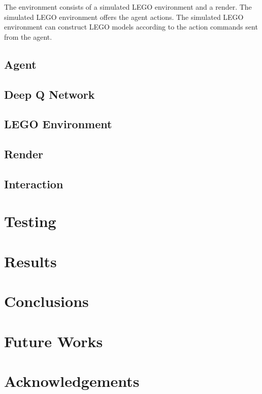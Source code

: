 \documentclass[a4paper]{article}
\begin{document}
            The environment consists of a simulated LEGO environment and a render. The simulated LEGO environment offers the agent actions. The simulated LEGO environment can construct LEGO models according to the action commands sent from the agent. 
            

            

        
        
        \subsection{Agent}
        
        
        \subsection{Deep Q Network}
        
        
        \subsection{LEGO Environment}
        
        
        \subsection{Render}
        
        
        \subsection{Interaction}
    
    \section{Testing}
    
    \section{Results}
    
    \section{Conclusions}
    
    \section{Future Works}
    
    \section{Acknowledgements}
    
    
    
    \nocite{*}
\end{document}
